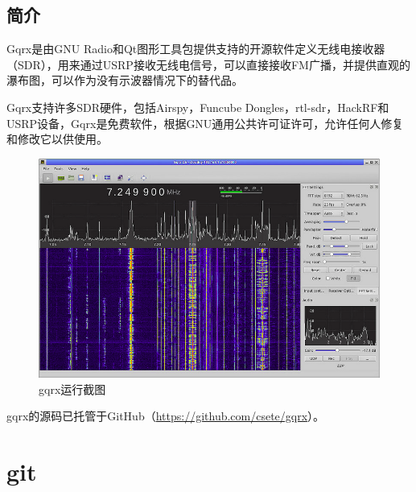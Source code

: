 		\subsection{简介}
			\par Gqrx是由GNU Radio和Qt图形工具包提供支持的开源软件定义无线电接收器（SDR），用来通过USRP接收无线电信号，可以直接接收FM广播，并提供直观的瀑布图，可以作为没有示波器情况下的替代品。
			\par Gqrx支持许多SDR硬件，包括Airspy，Funcube Dongles，rtl-sdr，HackRF和USRP设备，Gqrx是免费软件，根据GNU通用公共许可证许可，允许任何人修复和修改它以供使用。
			\begin{figure}[htb]
				\centering
				\includegraphics[width=13cm]{figures/gqrx.png}
				\caption{gqrx运行截图}
				\label{fig:gqrx运行截图}
			\end{figure}
			\par gqrx的源码已托管于GitHub（\href{https://github.com/csete/gqrx}{https://github.com/csete/gqrx}）。
	\section{git}
